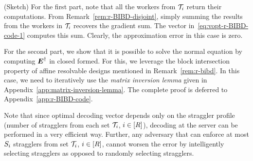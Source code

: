 \documentclass[conference,letterpaper]{IEEEtran}
\begin{document}
\begin{IEEEproof}
(Sketch) For the first part, %
note that all the workers from $\mathcal{T}_i$ return their computations. From Remark~\ref{rem:r-BIBD-disjoint}, %
simply summing the results from the workers in $\mathcal{T}_i$ recovers the gradient sum. The vector in~\eqref{eq:vopt-r-BIBD-code-1} computes this sum. Clearly, the approximation error in this case is zero.

For the second part, we show that it is possible to solve the normal equation by computing $\boldsymbol{E}^{\dagger}$ in closed formed. For this, we leverage the block intersection property of affine resolvable designs mentioned in Remark~\ref{rem:r-bibd}. In this case, we need to iteratively use the {\it matrix inversion lemma} given in Appendix~\ref{app:matrix-inversion-lemma}. The complete proof is deferred to Appendix~\ref{app:r-BIBD-code}. 
\end{IEEEproof}

\begin{remark}
\label{rem:r-BIBD-code-adversarial}
{
Note that since optimal decoding vector depends only on the straggler profile (number of stragglers from each set $\mathcal{T}_i$, $i\in[R]$), decoding at the server can be performed in a very efficient way. Further, any adversary that can enforce at most $S_i$ stragglers from set $\mathcal{T}_i$, $i\in[R]$, cannot worsen the error by  intelligently selecting stragglers as opposed to randomly selecting stragglers.
}
\end{remark}
\end{document}
